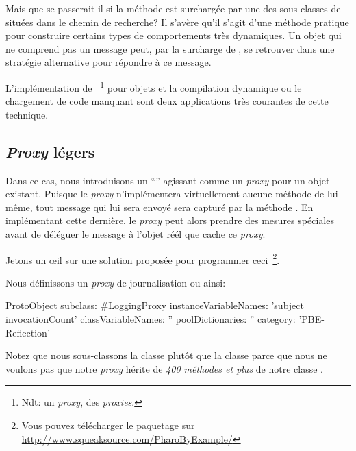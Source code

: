 \documentclass[a4paper,10pt,twoside]{book}
\begin{document}
Mais que se passerait-il si la méthode  est surchargée 
par une des sous-classes de  situées dans le chemin de recherche? %
Il s'avère qu'il s'agit d'une méthode pratique pour construire certains types de comportements très dynamiques. Un objet qui ne comprend pas un message peut, par la surcharge de , se retrouver dans une stratégie alternative pour répondre à ce message.

L'implémentation de ~\footnote{Ndt: un \emph{proxy}, des \emph{proxies}.} pour objets et la compilation dynamique ou le chargement de code manquant sont deux applications très courantes de cette technique.

\subsection{\emph{Proxy} légers}

Dans ce cas, nous introduisons un ``''
agissant comme un \emph{proxy} pour un objet existant.
Puisque le \emph{proxy} n'implémentera virtuellement aucune méthode de lui-même, tout message qui lui sera envoyé sera capturé par la méthode
 . En implémentant cette dernière, le \emph{proxy} peut alors prendre des mesures spéciales avant de déléguer le message à l'objet réél que cache ce \emph{proxy}.

Jetons un \oe il sur une solution proposée pour programmer ceci~\footnote{Vous pouvez télécharger le paquetage  sur \url{http://www.squeaksource.com/PharoByExample/}}.

Nous définissons un \emph{proxy} de journalisation ou  ainsi:

\begin{code}{}
ProtoObject subclass: #LoggingProxy
	instanceVariableNames: 'subject invocationCount'
	classVariableNames: ''
	poolDictionaries: ''
	category: 'PBE-Reflection'
\end{code}
Notez que nous sous-classons la classe  plutôt que la classe
 parce que nous ne voulons pas que notre \emph{proxy} hérite de \emph{400 méthodes et plus} de notre classe .
\end{document}
